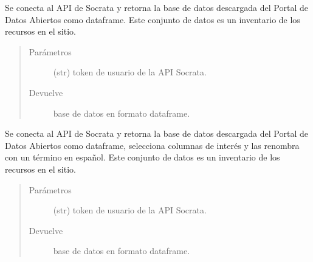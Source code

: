 \documentclass[letterpaper,10pt,openany,spanish]{sphinxmanual}
\begin{document}
\label{\detokenize{metadatos:module-metadatos}}

\begin{fulllineitems}
\label{\detokenize{metadatos:metadatos.asset_inventory}}
Se conecta al API de Socrata y retorna la base de datos  descargada del Portal de Datos Abiertos
como dataframe. Este conjunto de datos es un inventario de los recursos en el sitio.
\begin{quote}\begin{description}
\item[{Parámetros}] \leavevmode
{} \textendash{} (str)  \sphinxhyphen{} token de usuario de la API Socrata.

\item[{Devuelve}] \leavevmode
base de datos en formato dataframe.

\end{description}\end{quote}

\end{fulllineitems}


\begin{fulllineitems}
\label{\detokenize{metadatos:metadatos.asset_inventory_espanol}}
Se conecta al API de Socrata y retorna la base de datos  descargada del Portal de Datos Abiertos
como dataframe, selecciona columnas de interés y las renombra con un término en español. Este conjunto de datos es un inventario de los recursos en el sitio.
\begin{quote}\begin{description}
\item[{Parámetros}] \leavevmode
{} \textendash{} (str)  \sphinxhyphen{} token de usuario de la API Socrata.

\item[{Devuelve}] \leavevmode
base de datos en formato dataframe.

\end{description}\end{quote}

\end{fulllineitems}
\end{document}
